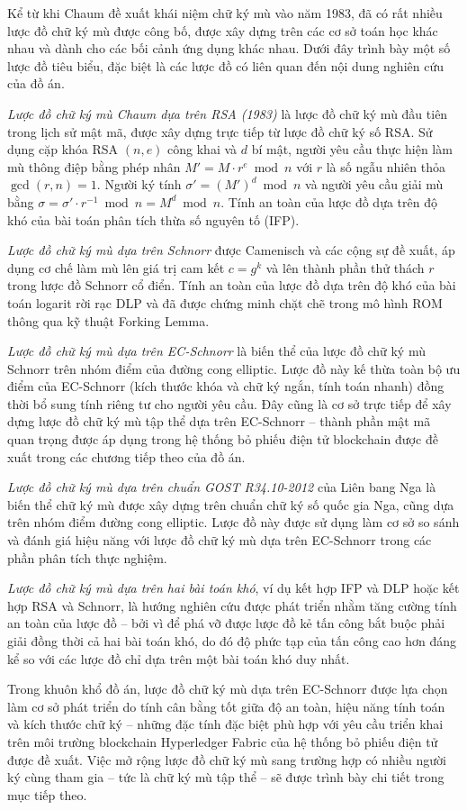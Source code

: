 Kể từ khi Chaum đề xuất khái niệm chữ ký mù vào năm 1983, đã có rất nhiều lược đồ chữ ký mù được công bố, được xây dựng trên các cơ sở toán học khác nhau và dành cho các bối cảnh ứng dụng khác nhau. Dưới đây trình bày một số lược đồ tiêu biểu, đặc biệt là các lược đồ có liên quan đến nội dung nghiên cứu của đồ án.

\textit{Lược đồ chữ ký mù Chaum dựa trên RSA (1983)} là lược đồ chữ ký mù đầu tiên trong lịch sử mật mã, được xây dựng trực tiếp từ lược đồ chữ ký số RSA. Sử dụng cặp khóa RSA $(n, e)$ công khai và $d$ bí mật, người yêu cầu thực hiện làm mù thông điệp bằng phép nhân $M' = M \cdot r^e \bmod n$ với $r$ là số ngẫu nhiên thỏa $\gcd(r, n) = 1$. Người ký tính $\sigma' = (M')^d \bmod n$ và người yêu cầu giải mù bằng $\sigma = \sigma' \cdot r^{-1} \bmod n = M^d \bmod n$. Tính an toàn của lược đồ dựa trên độ khó của bài toán phân tích thừa số nguyên tố (IFP).

\textit{Lược đồ chữ ký mù dựa trên Schnorr} được Camenisch và các cộng sự đề xuất, áp dụng cơ chế làm mù lên giá trị cam kết $c = g^k$ và lên thành phần thử thách $r$ trong lược đồ Schnorr cổ điển. Tính an toàn của lược đồ dựa trên độ khó của bài toán logarit rời rạc DLP và đã được chứng minh chặt chẽ trong mô hình ROM thông qua kỹ thuật Forking Lemma.

\textit{Lược đồ chữ ký mù dựa trên EC-Schnorr} là biến thể của lược đồ chữ ký mù Schnorr trên nhóm điểm của đường cong elliptic. Lược đồ này kế thừa toàn bộ ưu điểm của EC-Schnorr (kích thước khóa và chữ ký ngắn, tính toán nhanh) đồng thời bổ sung tính riêng tư cho người yêu cầu. Đây cũng là cơ sở trực tiếp để xây dựng lược đồ chữ ký mù tập thể dựa trên EC-Schnorr -- thành phần mật mã quan trọng được áp dụng trong hệ thống bỏ phiếu điện tử blockchain được đề xuất trong các chương tiếp theo của đồ án.

\textit{Lược đồ chữ ký mù dựa trên chuẩn GOST R34.10-2012} của Liên bang Nga là biến thể chữ ký mù được xây dựng trên chuẩn chữ ký số quốc gia Nga, cũng dựa trên nhóm điểm đường cong elliptic. Lược đồ này được sử dụng làm cơ sở so sánh và đánh giá hiệu năng với lược đồ chữ ký mù dựa trên EC-Schnorr trong các phần phân tích thực nghiệm.

\textit{Lược đồ chữ ký mù dựa trên hai bài toán khó}, ví dụ kết hợp IFP và DLP hoặc kết hợp RSA và Schnorr, là hướng nghiên cứu được phát triển nhằm tăng cường tính an toàn của lược đồ -- bởi vì để phá vỡ được lược đồ kẻ tấn công bắt buộc phải giải đồng thời cả hai bài toán khó, do đó độ phức tạp của tấn công cao hơn đáng kể so với các lược đồ chỉ dựa trên một bài toán khó duy nhất.

Trong khuôn khổ đồ án, lược đồ chữ ký mù dựa trên EC-Schnorr được lựa chọn làm cơ sở phát triển do tính cân bằng tốt giữa độ an toàn, hiệu năng tính toán và kích thước chữ ký -- những đặc tính đặc biệt phù hợp với yêu cầu triển khai trên môi trường blockchain Hyperledger Fabric của hệ thống bỏ phiếu điện tử được đề xuất. Việc mở rộng lược đồ chữ ký mù sang trường hợp có nhiều người ký cùng tham gia -- tức là chữ ký mù tập thể -- sẽ được trình bày chi tiết trong mục tiếp theo.
